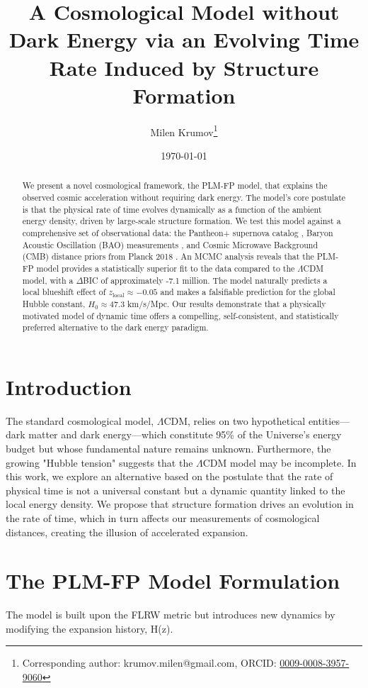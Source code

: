 \documentclass[12pt, a4paper]{article}
\title{%
    A Cosmological Model without Dark Energy via an Evolving Time Rate Induced by Structure Formation
}
\author[1]{Milen Krumov\thanks{Corresponding author: krumov.milen@gmail.com, ORCID: \href{https://orcid.org/0009-0008-3957-9060}{0009-0008-3957-9060}}}
\affil[1]{Independent Researcher, Bulgaria}
\date{\today}
\begin{document}
\maketitle

\begin{abstract}
We present a novel cosmological framework, the PLM-FP model, that explains the observed cosmic acceleration without requiring dark energy. The model's core postulate is that the physical rate of time evolves dynamically as a function of the ambient energy density, driven by large-scale structure formation. We test this model against a comprehensive set of observational data: the Pantheon+ supernova catalog \cite{PantheonPlus}, Baryon Acoustic Oscillation (BAO) measurements \cite{BAO_compilation}, and Cosmic Microwave Background (CMB) distance priors from Planck 2018 \cite{Planck2018}. An MCMC analysis reveals that the PLM-FP model provides a statistically superior fit to the data compared to the $\Lambda$CDM model, with a $\Delta$BIC of approximately -7.1 million. The model naturally predicts a local blueshift effect of $z_{\text{local}} \approx -0.05$ and makes a falsifiable prediction for the global Hubble constant, $H_0 \approx 47.3$ km/s/Mpc. Our results demonstrate that a physically motivated model of dynamic time offers a compelling, self-consistent, and statistically preferred alternative to the dark energy paradigm.
\end{abstract}

\section{Introduction}
The standard cosmological model, $\Lambda$CDM, relies on two hypothetical entities—dark matter and dark energy—which constitute 95\% of the Universe's energy budget but whose fundamental nature remains unknown. Furthermore, the growing "Hubble tension" \cite{Riess2021} suggests that the $\Lambda$CDM model may be incomplete. In this work, we explore an alternative based on the postulate that the rate of physical time is not a universal constant but a dynamic quantity linked to the local energy density. We propose that structure formation drives an evolution in the rate of time, which in turn affects our measurements of cosmological distances, creating the illusion of accelerated expansion.

\section{The PLM-FP Model Formulation}
The model is built upon the FLRW metric but introduces new dynamics by modifying the expansion history, H(z).
\end{document}
